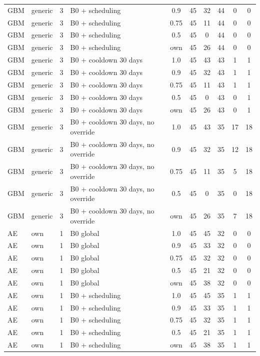 \documentclass[10pt,onecolumn,letterpaper]{article}
\begin{document}
\begin{longtable}{lllp{4.4cm}cccccc}
GBM & generic & 3 & B0 + scheduling & 0.9 & 45 & 32 & 44 & 0 & 0 \\
GBM & generic & 3 & B0 + scheduling & 0.75 & 45 & 11 & 44 & 0 & 0 \\
GBM & generic & 3 & B0 + scheduling & 0.5 & 45 & 0 & 44 & 0 & 0 \\
GBM & generic & 3 & B0 + scheduling & own & 45 & 26 & 44 & 0 & 0 \\
GBM & generic & 3 & B0 + cooldown 30 days & 1.0 & 45 & 43 & 43 & 1 & 1 \\
GBM & generic & 3 & B0 + cooldown 30 days & 0.9 & 45 & 32 & 43 & 1 & 1 \\
GBM & generic & 3 & B0 + cooldown 30 days & 0.75 & 45 & 11 & 43 & 1 & 1 \\
GBM & generic & 3 & B0 + cooldown 30 days & 0.5 & 45 & 0 & 43 & 0 & 1 \\
GBM & generic & 3 & B0 + cooldown 30 days & own & 45 & 26 & 43 & 0 & 1 \\
GBM & generic & 3 & B0 + cooldown 30 days, no override & 1.0 & 45 & 43 & 35 & 17 & 18 \\
GBM & generic & 3 & B0 + cooldown 30 days, no override & 0.9 & 45 & 32 & 35 & 12 & 18 \\
GBM & generic & 3 & B0 + cooldown 30 days, no override & 0.75 & 45 & 11 & 35 & 5 & 18 \\
GBM & generic & 3 & B0 + cooldown 30 days, no override & 0.5 & 45 & 0 & 35 & 0 & 18 \\
GBM & generic & 3 & B0 + cooldown 30 days, no override & own & 45 & 26 & 35 & 7 & 18 \\
AE & own & 1 & B0 global & 1.0 & 45 & 45 & 32 & 0 & 0 \\
AE & own & 1 & B0 global & 0.9 & 45 & 33 & 32 & 0 & 0 \\
AE & own & 1 & B0 global & 0.75 & 45 & 32 & 32 & 0 & 0 \\
AE & own & 1 & B0 global & 0.5 & 45 & 21 & 32 & 0 & 0 \\
AE & own & 1 & B0 global & own & 45 & 38 & 32 & 0 & 0 \\
AE & own & 1 & B0 + scheduling & 1.0 & 45 & 45 & 35 & 1 & 1 \\
AE & own & 1 & B0 + scheduling & 0.9 & 45 & 33 & 35 & 1 & 1 \\
AE & own & 1 & B0 + scheduling & 0.75 & 45 & 32 & 35 & 1 & 1 \\
AE & own & 1 & B0 + scheduling & 0.5 & 45 & 21 & 35 & 1 & 1 \\
AE & own & 1 & B0 + scheduling & own & 45 & 38 & 35 & 1 & 1 \\

\end{longtable}
\end{document}
